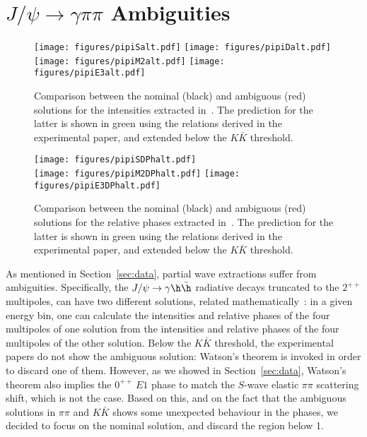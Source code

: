 \section{\boldmath $J/\psi\to \gamma\pi \pi$ Ambiguities}
\label{app:ambi}

\begin{figure}[t]
{\centering
\texttt{[image: figures/pipiSalt.pdf]} \texttt{[image: figures/pipiDalt.pdf]} \\
\texttt{[image: figures/pipiM2alt.pdf]} 
\texttt{[image: figures/pipiE3alt.pdf]} 
}
\caption{Comparison between the nominal (black) and ambiguous (red) solutions for the intensities extracted in~\cite{Ablikim:2015umt}. The prediction for the latter is shown in green using the relations derived in the experimental paper, and extended below the $K \bar K$ threshold.
}
\label{fig:ambi-intensities}
\end{figure}

\begin{figure}[t]
{\centering
\texttt{[image: figures/pipiSDPhalt.pdf]}  \\
\texttt{[image: figures/pipiM2DPhalt.pdf]} 
\texttt{[image: figures/pipiE3DPhalt.pdf]} 
}
\caption{Comparison between the nominal (black) and ambiguous (red) solutions for the relative phases extracted in~\cite{Ablikim:2015umt}. The prediction for the latter is shown in green using the relations derived in the experimental paper, and extended below the $K \bar K$ threshold.}
\label{fig:ambi-phases}
\end{figure}
As mentioned in Section~\ref{sec:data}, partial wave extractions suffer from ambiguities. 
Specifically, the $J/\psi\to \gamma \h \bar \h$ radiative decays truncated to the $2^{++}$ multipoles, can have two different solutions, related mathematically~\cite{Ablikim:2015umt,Ablikim:2018izx}: in a given energy bin, one can calculate the intensities and relative phases of the four multipoles of one solution from the intensities and relative phases of the four multipoles of the other solution. Below the $K \bar K$ threshold, the experimental papers do not show the ambiguous solution: Watson's theorem is invoked in order to discard one of them. However, as we showed in Section~\ref{sec:data}, Watson's theorem also implies the $0^{++}\,E1$ phase to match the $S$-wave elastic $\pi\pi$ scattering shift, which is not the case. Based on this, and on the fact that the ambiguous solutions in $\pi\pi$ and $K\bar K$ shows some unexpected behaviour in the phases, we decided to focus on the nominal solution, and discard the region below 1\gev.

